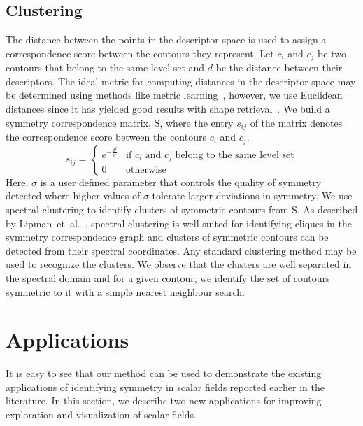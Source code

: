 \documentclass[review,journal]{vgtc}         %
\begin{document}
\subsection{Clustering}\label{clust}
The distance between the points in the descriptor space is used to assign 
a correspondence score between the contours they represent. Let $c_i$
and $c_j$ be two contours that belong to the same level set and $d$ be
the distance between their descriptors. The ideal metric for computing
distances in the descriptor space may be determined using methods like
metric learning~\cite{Kulis13}, however, we use
Euclidean distances since it has yielded good results with shape 
retrieval~\cite{reuter2006laplace,lian2013}. We build a symmetry
correspondence matrix, $\mathrm{S}$, where the entry $s_{ij}$ of the
matrix denotes the correspondence score between the contours $c_i$
and $c_j$.
$$s_{ij} = 
\begin{cases}
	e^{-\frac{d^2}{\sigma}} & \text{if $c_i$ and $c_j$ belong to the same level set}\\
	0 & \text{otherwise}
\end{cases}
$$
Here, $\sigma$ is a user defined parameter that controls the quality of symmetry detected
where higher values of $\sigma$ tolerate larger deviations in symmetry. We use spectral clustering
to identify clusters of symmetric contours from $\mathrm{S}$. As described by 
Lipman~et~al.~\cite{Lip10}, spectral clustering is well suited for identifying
cliques in the symmetry correspondence graph and clusters of symmetric
contours can be detected from their spectral coordinates. Any standard clustering
method may be used to recognize the clusters. We observe that the clusters
are well separated in the spectral domain and for a given contour, we identify
the set of contours symmetric to it with a simple nearest neighbour search.
\section{Applications}
It is easy to see that our method can be used to demonstrate the existing
applications of identifying symmetry in scalar fields reported earlier
in the literature. In this section, we describe two new applications
for improving exploration and visualization of scalar fields.
\end{document}
